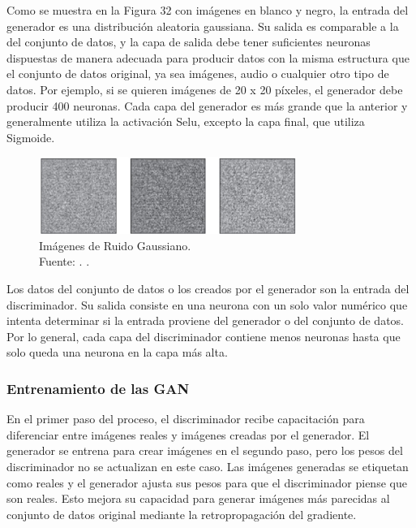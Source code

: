 Como se muestra en la Figura 32 con imágenes en blanco y negro, la entrada del generador es una distribución aleatoria gaussiana. Su salida es comparable a la del conjunto de datos, y la capa de salida debe tener suficientes neuronas dispuestas de manera adecuada para producir datos con la misma estructura que el conjunto de datos original, ya sea imágenes, audio o cualquier otro tipo de datos. Por ejemplo, si se quieren imágenes de 20 x 20 píxeles, el generador debe producir 400 neuronas. Cada capa del generador es más grande que la anterior y generalmente utiliza la activación Selu, excepto la capa final, que utiliza Sigmoide. \parencite{tec_goodfellow2014gan}

\begin{figure}[!ht]
	\begin{center}
		\includegraphics[width=0.75\textwidth]{2/figures/redgan3.jpg}
		\caption[Imágenes de Ruido Gaussiano]{Imágenes de Ruido Gaussiano.\\
		Fuente: \cite{tec_goodfellow2014gan}. .}
		\label{2:fig49}
	\end{center}
\end{figure}

Los datos del conjunto de datos o los creados por el generador son la entrada del discriminador. Su salida consiste en una neurona con un solo valor numérico que intenta determinar si la entrada proviene del generador o del conjunto de datos. Por lo general, cada capa del discriminador contiene menos neuronas hasta que solo queda una neurona en la capa más alta. \parencite{tec_goodfellow2014gan}

\subsubsection{Entrenamiento de las GAN}

En el primer paso del proceso, el discriminador recibe capacitación para diferenciar entre imágenes reales y imágenes creadas por el generador. El generador se entrena para crear imágenes en el segundo paso, pero los pesos del discriminador no se actualizan en este caso. Las imágenes generadas se etiquetan como reales y el generador ajusta sus pesos para que el discriminador piense que son reales. Esto mejora su capacidad para generar imágenes más parecidas al conjunto de datos original mediante la retropropagación del gradiente. \parencite{bk_geron2019machilear}

